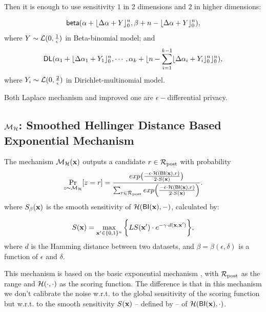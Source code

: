 \documentclass{article}
\begin{document}
 Then it is enough to use sensitivity $1$ in 2 dimensions and $2$ in higher dimensions:

 \[
 \mathsf{beta}(\alpha +  \lfloor{\Delta \alpha + Y}\rfloor^n_0,\beta + n - \lfloor{\Delta \alpha + Y}\rfloor^n_0),
 \]
 where $Y \sim \mathcal{L}(0, \frac{1}{\epsilon})$ in Beta-binomial model; and
 \[
 \mathsf{DL}(\alpha_1 +  \lfloor{\Delta \alpha_1 + Y_1}\rfloor^n_0, \cdots, \alpha_k + \lfloor n - \sum_{i = 1}^{k-1}\lfloor{\Delta \alpha_i + Y_i}\rfloor^n_0 \rfloor^n_0),
 \]
where $Y_i \sim \mathcal{L}(0, \frac{2}{\epsilon})$ in Dirichlet-multinomial model.

Both Laplace mechanism and improved one are $\epsilon -$differential privacy\cite{dwork2014algorithmic}.


\subsection{$\mathcal{M}_{\mathcal{H}}$: Smoothed Hellinger Distance Based Exponential Mechanism}
\label{subsec_hexpmech}

\begin{definition}
\label{def_smoo}
The mechanism $\mathcal{M}_{\mathcal{H}}(\textbf{x})$ outputs a candidate $r \in \mathcal{R}_{\textup{post}}$ with probability
\begin{equation*}
\underset{z \thicksim \mathcal{M}_{\mathcal{H}}}{\Pr}[z=r] = \frac {exp\big(\frac{-\epsilon\cdot\mathcal{H}(\mathsf{BI}(\textbf{x}),r)}{2\cdot S(\textbf{x})}\big)}
{\sum_{r\in\mathcal{R}_{\textup{post}}} exp\Big(\frac{-\epsilon\cdot\mathcal{H}(\mathsf{BI}(\textbf{x}),r)}{2\cdot S(\textbf{x})}\Big)}.
\end{equation*}
where $S_\beta(\textbf{x})$ is the smooth sensitivity of $\mathcal{H}(\mathsf{BI}(\textbf{x}),-)$, calculated by:

\begin{equation}
  \label{eq:smooth}
   S(\textbf{x})=\max_{\textbf{x}' \in \{0,1\}^{n}}\bigg \{LS(\textbf{x}') \cdot e^{-\gamma\cdot d(\textbf{x},\textbf{x}')}\bigg\},
\end{equation}
where $d$ is the Hamming distance between two datasets, and $\beta =
\beta(\epsilon, \delta)$ is a function of $\epsilon$ and $\delta$. 
\end{definition}

This mechanism is based on the basic exponential mechanism
\cite{talwar}, with $\mathcal{R}_{\textup{post}}$ as the range and
$\mathcal{H}(\cdot,\cdot)$ as the scoring function. The difference is
that in this mechanism we don't calibrate the noise w.r.t. to the
global sensitivity of the scoring function but w.r.t. to the smooth
sensitivity $S(\textbf{x})$ -- defined by \cite{nissim2007smooth}-- of
$\mathcal{H}(\mathsf{BI}(\textbf{x}), \cdot)$.
\end{document}
